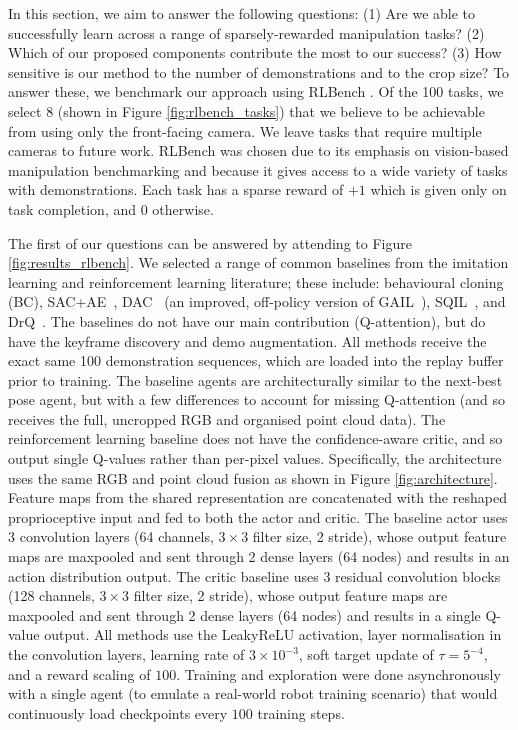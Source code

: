 \documentclass[letterpaper, 10 pt, journal, twoside]{IEEEtran}
\begin{document}
In this section, we aim to answer the following questions: (1) Are we able to successfully learn across a range of sparsely-rewarded manipulation tasks? (2) Which of our proposed components contribute the most to our success? (3) How sensitive is our method to the number of demonstrations and to the crop size? To answer these, we benchmark our approach using RLBench \cite{james2019rlbench}. Of the 100 tasks, we select 8 (shown in Figure \ref{fig:rlbench_tasks}) that we believe to be achievable from using only the front-facing camera. We leave tasks that require multiple cameras to future work. RLBench was chosen due to its emphasis on vision-based manipulation benchmarking and because it gives access to a wide variety of tasks with demonstrations. Each task has a sparse reward of $+1$ which is given only on task completion, and $0$ otherwise. 

The first of our questions can be answered by attending to Figure \ref{fig:results_rlbench}. We selected a range of common baselines from the imitation learning and reinforcement learning literature; these include: behavioural cloning (BC), SAC+AE~\cite{yarats2019improving}, DAC~\cite{kostrikov2018discriminator} (an improved, off-policy version of GAIL~\cite{ho2016generative}), SQIL~\cite{reddy2019sqil}, and DrQ~\cite{kostrikov2020image}. The baselines do not have our main contribution (Q-attention), but do have the keyframe discovery and demo augmentation. All methods receive the exact same 100 demonstration sequences, which are loaded into the replay buffer prior to training. The baseline agents are architecturally similar to the next-best pose agent, but with a few differences to account for missing Q-attention (and so receives the full, uncropped RGB and organised point cloud data). The reinforcement learning baseline does not have the confidence-aware critic, and so output single Q-values rather than per-pixel values. Specifically, the architecture uses the same RGB and point cloud fusion as shown in Figure \ref{fig:architecture}. Feature maps from the shared representation are concatenated with the reshaped proprioceptive input and fed to both the actor and critic. The baseline actor uses 3 convolution layers (64 channels, $3 \times 3$ filter size, 2 stride), whose output feature maps are maxpooled and sent through 2 dense layers (64 nodes) and results in an action distribution output. The critic baseline uses 3 residual convolution blocks (128 channels, $3 \times 3$ filter size, 2 stride), whose output feature maps are maxpooled and sent through 2 dense layers (64 nodes) and results in a single Q-value output. All methods use the LeakyReLU activation, layer normalisation in the convolution layers, learning rate of $3\times10^{-3}$, soft target update of $\tau=5^{-4}$, and a reward scaling of $100$. Training and exploration were done asynchronously with a single agent (to emulate a real-world robot training scenario) that would continuously load checkpoints every $100$ training steps. 
\end{document}
